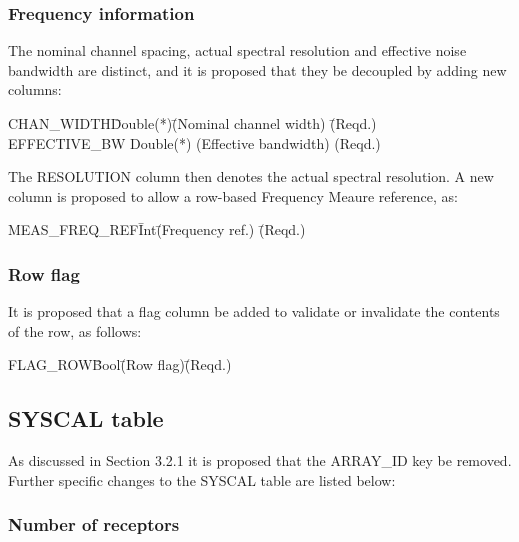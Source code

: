 \documentclass{article}
\begin{document}
\subsubsection{Frequency information}

The nominal channel spacing, actual spectral resolution and effective
noise bandwidth are distinct, and it is proposed that they be
decoupled by adding new columns:

\begin{tabbing}
CHAN\_WIDTH\quad\quad \= Double(*)\quad\quad \= 
(Nominal channel width) \quad\quad\quad\quad\quad \= (Reqd.) \\
EFFECTIVE\_BW \> Double(*) \> (Effective bandwidth) \> (Reqd.)\\
\end{tabbing}

The RESOLUTION column then denotes the actual spectral resolution.  A
new column is proposed to allow a row-based Frequency Meaure
reference, as:

\begin{tabbing}
MEAS\_FREQ\_REF\quad\quad \= Int\quad\quad \= (Frequency ref.)\quad\quad 
 \= (Reqd.) \\
\end{tabbing}

\subsubsection{Row flag}

It is proposed that a flag column be added to validate or invalidate
the contents of the row, as follows:

\begin{tabbing}
FLAG\_ROW\quad\quad \= Bool\quad\quad \= (Row flag)\quad\quad \= (Reqd.)\\
\end{tabbing}

\subsection{SYSCAL table}

As discussed in Section 3.2.1 it is proposed that the ARRAY\_ID key be
removed.  Further specific changes to the SYSCAL table are listed
below:

\subsubsection{Number of receptors}
\end{document}
